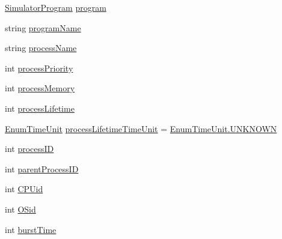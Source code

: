 \begin{DoxyCompactItemize}
\item 
\hyperlink{class_c_p_u___o_s___simulator_1_1_c_p_u_1_1_simulator_program}{Simulator\+Program} \hyperlink{class_c_p_u___o_s___simulator_1_1_operating___system_1_1_simulator_process_aed4dc26a67cf9f15930f22941484219a}{program}
\item 
string \hyperlink{class_c_p_u___o_s___simulator_1_1_operating___system_1_1_simulator_process_aacd55b65bf86395ae3c1a446d580030e}{program\+Name}
\item 
string \hyperlink{class_c_p_u___o_s___simulator_1_1_operating___system_1_1_simulator_process_a6d29b67977f07ebb1b6336b96960752b}{process\+Name}
\item 
int \hyperlink{class_c_p_u___o_s___simulator_1_1_operating___system_1_1_simulator_process_a122acf698432625719c9ddd0152aab0d}{process\+Priority}
\item 
int \hyperlink{class_c_p_u___o_s___simulator_1_1_operating___system_1_1_simulator_process_af574b021e490c03ed55332ee0ed4c067}{process\+Memory}
\item 
int \hyperlink{class_c_p_u___o_s___simulator_1_1_operating___system_1_1_simulator_process_aa70f97b2b63f49ded3d505d104a1f3d9}{process\+Lifetime}
\item 
\hyperlink{namespace_c_p_u___o_s___simulator_1_1_operating___system_a0553d0bc2513aec52caa769acf994d5c}{Enum\+Time\+Unit} \hyperlink{class_c_p_u___o_s___simulator_1_1_operating___system_1_1_simulator_process_a53aad888e888ff8f9a3999047f14d362}{process\+Lifetime\+Time\+Unit} = \hyperlink{namespace_c_p_u___o_s___simulator_1_1_operating___system_aea0b669d1bbf5690ae34ac2f8bef9470a696b031073e74bf2cb98e5ef201d4aa3}{Enum\+Time\+Unit.\+U\+N\+K\+N\+O\+W\+N}
\item 
int \hyperlink{class_c_p_u___o_s___simulator_1_1_operating___system_1_1_simulator_process_a1dc38ec3dc556cacd6de21a0ecd5e440}{process\+I\+D}
\item 
int \hyperlink{class_c_p_u___o_s___simulator_1_1_operating___system_1_1_simulator_process_af7c5460498b8fc188df0d4c12b62c15b}{parent\+Process\+I\+D}
\item 
int \hyperlink{class_c_p_u___o_s___simulator_1_1_operating___system_1_1_simulator_process_ae26fd9d2bdc4dc5012260c39f289d4de}{C\+P\+Uid}
\item 
int \hyperlink{class_c_p_u___o_s___simulator_1_1_operating___system_1_1_simulator_process_a1b124e6b0a70221c4739a78d81c89aaf}{O\+Sid}
\item 
int \hyperlink{class_c_p_u___o_s___simulator_1_1_operating___system_1_1_simulator_process_aaa8160807178efd2cb70364dc48a8c70}{burst\+Time}

\end{DoxyCompactItemize}
